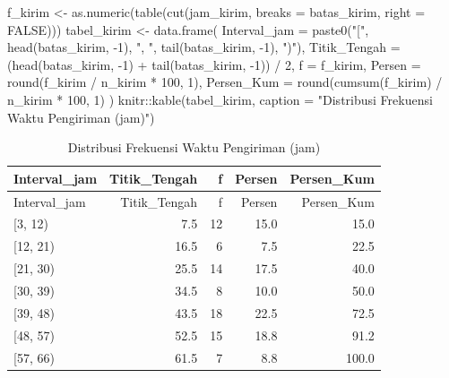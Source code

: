 \documentclass[
  indonesian,
  letterpaper,
]{book}
\newenvironment{Shaded}{\begin{snugshade}}{\end{snugshade}}
\newcommand{\AttributeTok}[1]{\textcolor[rgb]{0.40,0.45,0.13}{#1}}
\newcommand{\ConstantTok}[1]{\textcolor[rgb]{0.56,0.35,0.01}{#1}}
\newcommand{\DecValTok}[1]{\textcolor[rgb]{0.68,0.00,0.00}{#1}}
\newcommand{\FunctionTok}[1]{\textcolor[rgb]{0.28,0.35,0.67}{#1}}
\newcommand{\NormalTok}[1]{\textcolor[rgb]{0.00,0.23,0.31}{#1}}
\newcommand{\OtherTok}[1]{\textcolor[rgb]{0.00,0.23,0.31}{#1}}
\newcommand{\SpecialCharTok}[1]{\textcolor[rgb]{0.37,0.37,0.37}{#1}}
\newcommand{\StringTok}[1]{\textcolor[rgb]{0.13,0.47,0.30}{#1}}
\begin{document}
\begin{Shaded}
\begin{Highlighting}[]
\NormalTok{f\_kirim }\OtherTok{\textless{}{-}} \FunctionTok{as.numeric}\NormalTok{(}\FunctionTok{table}\NormalTok{(}\FunctionTok{cut}\NormalTok{(jam\_kirim, }\AttributeTok{breaks =}\NormalTok{ batas\_kirim, }\AttributeTok{right =} \ConstantTok{FALSE}\NormalTok{)))}
\NormalTok{tabel\_kirim }\OtherTok{\textless{}{-}} \FunctionTok{data.frame}\NormalTok{(}
\AttributeTok{Interval\_jam =} \FunctionTok{paste0}\NormalTok{(}\StringTok{"["}\NormalTok{, }\FunctionTok{head}\NormalTok{(batas\_kirim, }\SpecialCharTok{{-}}\DecValTok{1}\NormalTok{), }\StringTok{", "}\NormalTok{, }\FunctionTok{tail}\NormalTok{(batas\_kirim, }\SpecialCharTok{{-}}\DecValTok{1}\NormalTok{), }\StringTok{")"}\NormalTok{),}
\AttributeTok{Titik\_Tengah =}\NormalTok{ (}\FunctionTok{head}\NormalTok{(batas\_kirim, }\SpecialCharTok{{-}}\DecValTok{1}\NormalTok{) }\SpecialCharTok{+} \FunctionTok{tail}\NormalTok{(batas\_kirim, }\SpecialCharTok{{-}}\DecValTok{1}\NormalTok{)) }\SpecialCharTok{/} \DecValTok{2}\NormalTok{,}
\AttributeTok{f =}\NormalTok{ f\_kirim,}
\AttributeTok{Persen =} \FunctionTok{round}\NormalTok{(f\_kirim }\SpecialCharTok{/}\NormalTok{ n\_kirim }\SpecialCharTok{*} \DecValTok{100}\NormalTok{, }\DecValTok{1}\NormalTok{),}
\AttributeTok{Persen\_Kum =} \FunctionTok{round}\NormalTok{(}\FunctionTok{cumsum}\NormalTok{(f\_kirim) }\SpecialCharTok{/}\NormalTok{ n\_kirim }\SpecialCharTok{*} \DecValTok{100}\NormalTok{, }\DecValTok{1}\NormalTok{)}
\NormalTok{)}
\NormalTok{knitr}\SpecialCharTok{::}\FunctionTok{kable}\NormalTok{(tabel\_kirim, }\AttributeTok{caption =} \StringTok{"Distribusi Frekuensi Waktu Pengiriman (jam)"}\NormalTok{)}
\end{Highlighting}
\end{Shaded}

\begin{longtable}[]{@{}lrrrr@{}}
\caption{Distribusi Frekuensi Waktu Pengiriman (jam)}\tabularnewline
\toprule\noalign{}
Interval\_jam & Titik\_Tengah & f & Persen & Persen\_Kum \\
\midrule\noalign{}
\endfirsthead
\toprule\noalign{}
Interval\_jam & Titik\_Tengah & f & Persen & Persen\_Kum \\
\midrule\noalign{}
\endhead
\bottomrule\noalign{}
\endlastfoot
{[}3, 12) & 7.5 & 12 & 15.0 & 15.0 \\
{[}12, 21) & 16.5 & 6 & 7.5 & 22.5 \\
{[}21, 30) & 25.5 & 14 & 17.5 & 40.0 \\
{[}30, 39) & 34.5 & 8 & 10.0 & 50.0 \\
{[}39, 48) & 43.5 & 18 & 22.5 & 72.5 \\
{[}48, 57) & 52.5 & 15 & 18.8 & 91.2 \\
{[}57, 66) & 61.5 & 7 & 8.8 & 100.0 \\
\end{longtable}
\end{document}
